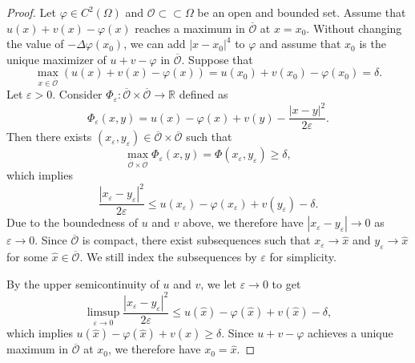 \documentclass[10pt,a4paper]{amsart}
\def\O{{\mathcal O}}
\def\ol{\overline}
\def\vep{\varepsilon}
\newcommand{\R}{\mathbb{R}}
\begin{document}
\begin{proof}
Let $\varphi\in C^2(\Omega)$ and $\O\subset\subset \Omega$ be an open and bounded set. 
Assume that $u(x)+v(x)-\varphi(x)$ reaches a maximum in $\overline{\O}$ at $x=x_0$. Without changing the value of $-\Delta \varphi(x_0)$, we can add $|x-x_0|^4$ to $\varphi$ and assume that $x_0$ is the unique maximizer of $u+v-\varphi$ in $\ol{\O}$.   Suppose that
\[
\max_{x\in \overline{\O}}(u(x)+v(x)-\varphi(x))=u(x_0)+v(x_0)-\varphi(x_0)=\delta.
\]
Let $\varepsilon>0$. Consider $\Phi_\varepsilon:\overline{\O}\times\overline{\O}\to \R$ defined as
\[
\Phi_\varepsilon(x,y)=u(x)-\varphi(x)+v(y)-\frac{|x-y|^2}{2\varepsilon}.
\]
Then there exists $(x_\varepsilon, y_\varepsilon)\in \overline{\O}\times \overline{\O}$ such that
\[
\max_{\overline{\O}\times\overline{\O}}\Phi_\varepsilon(x,y)=\Phi(x_\varepsilon, y_\varepsilon)\ge \delta,
\]
which implies
\[
\frac{|x_\varepsilon-y_\varepsilon|^2}{2\varepsilon}\le u(x_\varepsilon)-\varphi(x_\varepsilon)+v(y_\varepsilon)-\delta.
\]
Due to the boundedness of $u$ and $v$ above, we therefore have $|x_\vep-y_\vep|\to 0$ as $\vep\to 0$. Since $\overline{\O}$ is compact, there exist subsequences such that $x_\varepsilon\to \hat{x}$ and $y_\varepsilon\to \hat{x}$ for some $\hat{x}\in \overline{\O}$. We still index the subsequences by $\vep$ for simplicity. 

By the upper semicontinuity of $u$ and $v$, we let $\vep\to 0$ to get
\[
\limsup_{\varepsilon\to 0}\frac{|x_\varepsilon-y_\varepsilon|^2}{2\varepsilon}\le u(\hat{x})-\varphi(\hat{x})+v(\hat{x})-\delta,
\]
which implies $u(\hat{x})-\varphi(\hat{x})+v(\hat{x})\geq \delta$. 
Since $u+v-\varphi$ achieves a unique maximum in $\ol{\O}$ at $x_0$, we therefore have $x_0=\hat{x}$. 



\end{proof}
\end{document}
